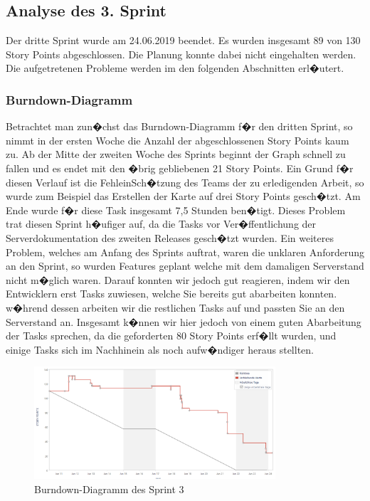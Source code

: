 \documentclass[12pt, titlepage]{scrartcl}
\begin{document}
		\subsection{Analyse des 3. Sprint}
		Der dritte Sprint wurde am 24.06.2019 beendet. Es wurden insgesamt 89 von 130 Story Points abgeschlossen. Die Planung konnte dabei nicht eingehalten werden. Die aufgetretenen Probleme werden im den folgenden Abschnitten erl�utert.
		
		\subsubsection{Burndown-Diagramm}
		Betrachtet man zun�chst das Burndown-Diagramm f�r den dritten Sprint, so nimmt in der ersten Woche die Anzahl der abgeschlossenen Story Points kaum zu. Ab der Mitte der zweiten Woche des Sprints beginnt der Graph schnell zu fallen und es endet mit den �brig gebliebenen 21 Story Points. Ein Grund f�r diesen Verlauf ist die FehleinSch�tzung des Teams der zu erledigenden Arbeit, so wurde zum Beispiel das Erstellen der Karte auf drei Story Points gesch�tzt. Am Ende wurde f�r diese Task insgesamt 7,5 Stunden ben�tigt. Dieses Problem trat diesen Sprint h�ufiger auf, da die Tasks vor Ver�ffentlichung der Serverdokumentation des zweiten Releases gesch�tzt wurden. Ein weiteres Problem, welches am Anfang des Sprints auftrat, waren die unklaren Anforderung an den Sprint, so wurden Features geplant welche mit dem damaligen Serverstand nicht m�glich waren. Darauf konnten wir jedoch gut reagieren, indem wir den Entwicklern erst Tasks zuwiesen, welche Sie bereits gut abarbeiten konnten. w�hrend dessen arbeiten wir die restlichen Tasks auf und passten Sie an den Serverstand an. Insgesamt k�nnen wir hier jedoch von einem guten Abarbeitung der Tasks sprechen, da die geforderten 80 Story Points erf�llt wurden, und einige Tasks sich im Nachhinein als noch aufw�ndiger heraus stellten. 
		
		\begin{figure}[H] 
			\centering
			\includegraphics[width=0.8\textwidth]{BurndownChart_Sprint3.PNG}
			\caption{Burndown-Diagramm des Sprint 3}
			\label{BurndownSprint3}
		\end{figure}
		
\end{document}
